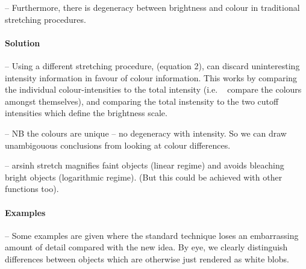 \documentclass[letterpaper, 11pt]{article}
\begin{document}
-- Furthermore, there is degeneracy between brightness and colour in traditional stretching procedures.


\paragraph{Solution}

-- Using a different stretching procedure, (equation 2), can discard uninteresting intensity information in favour of colour information. This works by comparing the individual colour-intensities to the total intensity (i.e. ~ compare the colours amongst themselves), and comparing the total instensity to the two cutoff intensities which define the brightness scale.

-- NB the colours are unique -- no degeneracy with intensity. So we can draw unambigouous conclusions from looking at colour differences.

-- arsinh stretch magnifies faint objects (linear regime) and avoids bleaching bright objects (logarithmic regime). (But this could be achieved with other functions too).


\paragraph{Examples}

-- Some examples are given where the standard technique loses an embarrassing amount of detail compared with the new idea. By eye, we clearly distinguish differences between objects which are otherwise just rendered as white blobs.


\newpage
{}


\end{document}
